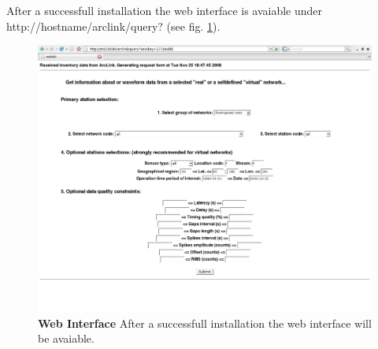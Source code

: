 \documentclass[11pt,a4paper,titlepage]{article}
\begin{document}
After a successfull installation the web interface is avaiable under http://hostname/arclink/query?
(see fig. \ref{fig_webinterface}).
\begin{figure}[ht]
	\centering
	\includegraphics[width=17cm]{webinterface.eps}
	\caption[Web Interface]{\textbf{Web Interface} After a successfull installation the
    web interface will be avaiable.}
	\label{fig_webinterface}
\end{figure}
\end{document}
